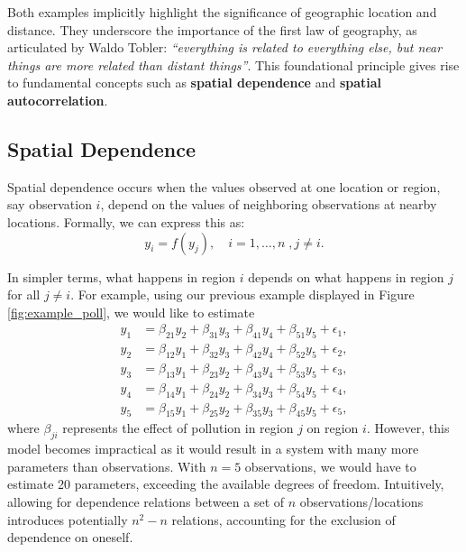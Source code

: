Both examples implicitly highlight the significance of geographic location and distance. They underscore the importance of the first law of geography, as articulated by Waldo Tobler: \emph{``everything is related to everything else, but near things are more related than distant things''}. This foundational principle gives rise to fundamental concepts such as \textbf{spatial dependence} and \textbf{spatial autocorrelation}.

\subsection{Spatial Dependence}\label{sec:spatial_dependence}

Spatial dependence occurs when the values observed at one location or region, say observation $i$, depend on the values of neighboring observations at nearby locations. Formally, we can express this as:
\begin{equation*}
  y_i = f(y_j),\quad i = 1,\ldots,n\;, j\neq i.
\end{equation*}

In simpler terms, what happens in region $i$ depends on what happens in region $j$ for all $j \neq i$. For example, using our previous example displayed in Figure \ref{fig:example_poll}, we would like to estimate 
\begin{equation*}
  \begin{aligned}
y_1 & = \beta_{21} y_2 + \beta_{31} y_3 + \beta_{41} y_4 + \beta_{51} y_5 + \epsilon_1, \\
y_2 & = \beta_{12} y_1 + \beta_{32} y_3 + \beta_{42} y_4 + \beta_{52} y_5 + \epsilon_2, \\
y_3 & = \beta_{13} y_1 + \beta_{23} y_2 + \beta_{43} y_4 + \beta_{53} y_5 + \epsilon_3, \\
y_4 & = \beta_{14} y_1 + \beta_{24} y_2 + \beta_{34} y_3 + \beta_{54} y_5 + \epsilon_4, \\
y_5 & = \beta_{15} y_1 + \beta_{25} y_2 + \beta_{35} y_3 + \beta_{45} y_5 + \epsilon_5, 
\end{aligned}
\end{equation*}
%
where $\beta_{ji}$ represents the effect of pollution in region $j$ on region $i$. However, this model becomes impractical as it would result in a system with many more parameters than observations. With $n = 5$ observations, we would have to estimate 20 parameters, exceeding the available degrees of freedom. Intuitively, allowing for dependence relations between a set of $n$ observations/locations introduces potentially $n^2 - n$ relations, accounting for the exclusion of dependence on oneself.

